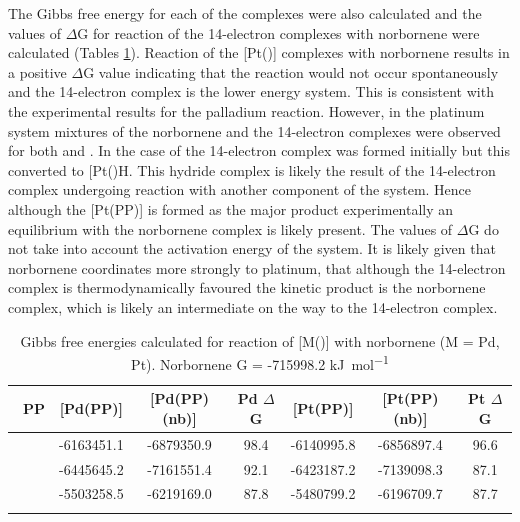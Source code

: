 The Gibbs free energy for each of the complexes were also calculated and the values of $\Delta$G for reaction of the 14-electron complexes with norbornene  were calculated (Tables \ref{DFT:nbenergy}).  Reaction of the [Pt(\tBuxantphos)] complexes with norbornene results in a positive $\Delta$G value indicating that the reaction would not occur spontaneously and the 14-electron complex is the lower energy system.  This is consistent with the experimental results for the palladium reaction.  However, in the platinum system mixtures of the norbornene and the 14-electron complexes were observed for both \tBusixantphos{} and \tButhixantphos.  In the case of \tBuxantphos{} the 14-electron complex was formed initially but this converted to [Pt(\tBuxantphosk)H\ce{]+}.  This hydride complex is likely the result of the 14-electron complex undergoing reaction with another component of the system.  Hence although the [Pt(PP)] is formed as the major product experimentally an equilibrium with the norbornene complex is likely present.  The values of $\Delta$G do not take into account the activation energy of the system.  It is likely given that norbornene coordinates more strongly to platinum, that although the 14-electron complex is thermodynamically favoured the kinetic product is the norbornene complex, which is likely an intermediate on the way to the 14-electron complex.  

\begin{table}
\caption[Gibbs free energies calculated for reaction of [M(\tBuxantphos){]} with norbornene]{Gibbs free energies calculated for reaction of [M(\tBuxantphos)] with norbornene (M = Pd, Pt).  Norbornene G = -715998.2 \si{\kilo\joule\per\mole}}
\vspace{1em}
\label{DFT:nbenergy}
\small
\begin{center}
\begin{tabular}{l c c c c c c}
	\toprule
	~\bfseries{PP} & {[}Pd(PP)] & {[}Pd(PP)(nb)] & Pd $\Delta$G & {[}Pt(PP)] & {[}Pt(PP)(nb)] & Pt $\Delta$G \\
	\midrule		
	~\tBuSixantphos	& -6163451.1	& -6879350.9 & 98.4 & -6140995.8 & -6856897.4 & 96.6 \\
	~\tBuThixantphos	& -6445645.2	& -7161551.4 & 92.1 & -6423187.2 & -7139098.3 & 87.1 \\
	~\tBuXantphos{}	& -5503258.5	& -6219169.0 & 87.8 & -5480799.2 & -6196709.7 & 87.7 \\
	\bottomrule{}
\end{tabular}
\end{center}
\end{table}

